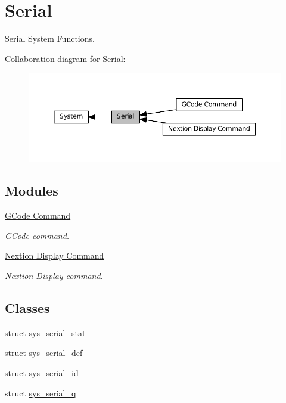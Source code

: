\hypertarget{group__SYSTEM__SERIAL__COMM}{}\section{Serial}
\label{group__SYSTEM__SERIAL__COMM}


Serial System Functions.  


Collaboration diagram for Serial\+:\nopagebreak
\begin{figure}[H]
\begin{center}
\leavevmode
\includegraphics[width=350pt]{group__SYSTEM__SERIAL__COMM}
\end{center}
\end{figure}
\subsection*{Modules}
\begin{DoxyCompactItemize}
\item 
\hyperlink{group__SYSTEM__SERIAL__GCODE}{G\+Code Command}
\begin{DoxyCompactList}\small\item\em G\+Code command. \end{DoxyCompactList}\item 
\hyperlink{group__SYSTEM__SERIAL__NEXTION}{Nextion Display Command}
\begin{DoxyCompactList}\small\item\em Nextion Display command. \end{DoxyCompactList}\end{DoxyCompactItemize}
\subsection*{Classes}
\begin{DoxyCompactItemize}
\item 
struct \hyperlink{structsys__serial__stat}{sys\+\_\+serial\+\_\+stat}
\item 
struct \hyperlink{structsys__serial__def}{sys\+\_\+serial\+\_\+def}
\item 
struct \hyperlink{structsys__serial__id}{sys\+\_\+serial\+\_\+id}
\item 
struct \hyperlink{structsys__serial__q}{sys\+\_\+serial\+\_\+q}
\end{DoxyCompactItemize}
